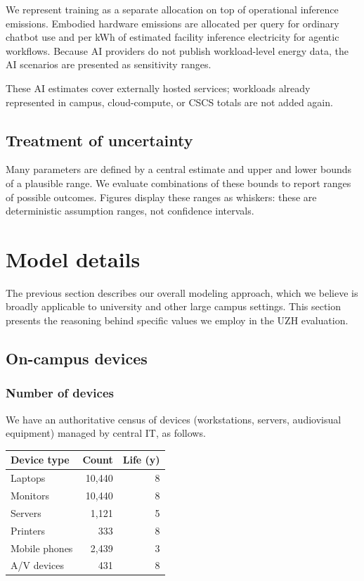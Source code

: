 \documentclass[11pt]{article}
\begin{document}
We represent training as a separate allocation on top of operational inference
emissions. Embodied hardware emissions are allocated per query for ordinary
chatbot use and per kWh of estimated facility inference electricity for
agentic workflows. Because AI providers do not publish workload-level energy data, the
AI scenarios are presented as sensitivity ranges.

These AI estimates cover externally hosted services; workloads already
represented in campus, cloud-compute, or CSCS totals are not added again.

\subsection{Treatment of uncertainty}

Many parameters are defined by a central estimate and upper and lower bounds of
a plausible range. We evaluate combinations of these bounds to report ranges of
possible outcomes. Figures display these ranges as whiskers: these are
deterministic assumption ranges, not confidence intervals.

\section{Model details}
\label{sec:model:details}

The previous section describes our overall modeling approach, which we believe
is broadly applicable to university and other large campus settings. This
section presents the reasoning behind specific values we employ in the UZH
evaluation.

\subsection{On-campus devices}

\subsubsection*{Number of devices}

We have an authoritative census of devices (workstations, servers, audiovisual
equipment) managed by central IT, as follows.

\begin{center}
  \begin{tabular}{|l|r|r|}
    \hline
    \textbf{Device type} & \textbf{Count} & \textbf{Life (y)}\\ \hline
    Laptops & 10,440 & 8 \\
    Monitors & 10,440 & 8 \\
    Servers & 1,121 & 5 \\
    Printers & 333 & 8 \\
    Mobile phones & 2,439 & 3 \\
    A/V devices & 431 & 8 \\ \hline
  \end{tabular}
  \label{tab:oncampusdevices}
\end{center}
\end{document}
